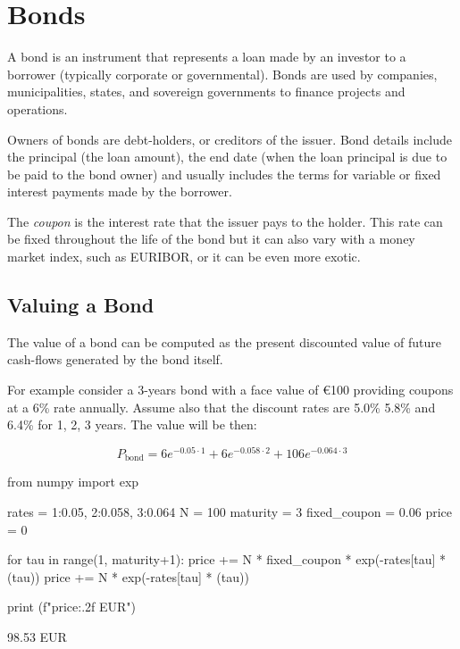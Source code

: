 \chapter{Bonds}
\label{bonds}

A bond is an instrument that represents a loan made by an investor to a borrower (typically corporate or governmental). Bonds are used by companies, 
municipalities, states, and sovereign governments to finance projects and operations. 

Owners of bonds are debt-holders, or creditors of the issuer. Bond details include the principal (the loan amount), the end date (when the loan principal 
is due to be paid to the bond owner) and usually includes the terms for variable or fixed interest payments made by the borrower.

The \emph{coupon} is the interest rate that the issuer pays to the holder. This rate can be fixed throughout the life of the bond but it can also vary with a 
money market index, such as EURIBOR, or it can be even more exotic.

\section{Valuing a Bond}
\label{sec:bond_pricing}

The value of a bond can be computed as the present discounted value of future cash-flows generated by the bond itself.

For example consider a 3-years bond with a face value of \euro{100} providing coupons at a 6\% rate annually. Assume also that the discount rates 
are 5.0\% 5.8\% and 6.4\% for 1, 2, 3 years. The value will be then:

\begin{equation*}
P_{\mathrm{bond}}=6e^{-0.05\cdot 1}+6e^{-0.058\cdot 2}+106e^{-0.064\cdot 3}
\end{equation*}

\begin{ipythonnon}
from numpy import exp

rates = {1:0.05, 2:0.058, 3:0.064}
N = 100
maturity = 3
fixed_coupon = 0.06
price = 0

for tau in range(1, maturity+1):
    price += N * fixed_coupon * exp(-rates[tau] * (tau))
price += N * exp(-rates[tau] * (tau))

print (f"{price:.2f} EUR")
\end{ipythonnon}
\begin{ioutput}
98.53 EUR
\end{ioutput}

